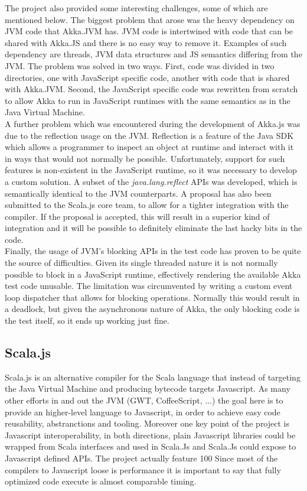 \documentclass{sig-alternate}
\begin{document}
The project also provided some interesting challenges, some of which are mentioned below.
The biggest problem that arose was the heavy dependency on JVM code that Akka.JVM has. JVM code is intertwined with code that
can be shared with Akka.JS and there is no easy way to remove it. Examples of such dependency are threads, JVM data structures
and JS semantics differing from the JVM.
The problem was solved in two ways. First, code was divided in two directories, one with JavaScript specific code, another with
code that is shared with Akka.JVM. Second, the JavaScript specific code was rewritten from scratch to allow Akka to run in JavaScript 
runtimes with the same semantics as in the Java Virtual Machine.
\\
A further problem which was encountered during the development of Akka.js was due to the reflection usage on the JVM. Reflection is
a feature of the Java SDK which allows a programmer to inspect an object at runtime and interact with it in ways that would not 
normally be possible. Unfortunately, support for such features is non-existent in the JavaScript runtime, so it was necessary to
develop a custom solution. A subset of the \emph{java.lang.reflect} APIs was developed, which is semantically identical to the JVM
counterparts. A proposal has also been submitted to the Scala.js core team, to allow for a tighter integration with the compiler. 
If the proposal is accepted, this will result in a superior kind of integration and it will be possible to definitely eliminate the
last hacky bits in the code.
\\
Finally, the usage of JVM's blocking APIs in the test code has proven to be quite the source of difficulties. Given its single threaded
nature it is not normally possible to block in a JavaScript runtime, effectively rendering the available Akka test code unusable.
The limitation was circumvented by writing a custom event loop dispatcher that allows for blocking operations. Normally this would result
in a deadlock, but given the asynchronous nature of Akka, the only blocking code is the test itself, so it ends up working just fine.

\subsection{Scala.js}

Scala.js is an alternative compiler for the Scala language that instead of targeting the Java Virtual Machine and producing bytecode targets Javascript.
As many other efforts in and out the JVM (GWT, CoffeeScript, ...) the goal here is to provide an higher-level language to Javascript, in order to achieve easy code reusability, abstranctions and tooling.
Moreover one key point of the project is Javascript interoperability, in both directions, plain Javascript libraries could be wrapped from Scala interfaces and used in Scala.Js and Scala.Js could expose to Javascript defined APIs.
The project actually feature 100%
Since most of the compilers to Javascript loose is performance it is important to say that fully optimized code execute is almost comparable timing.
\end{document}
